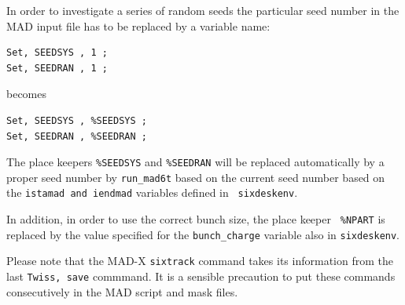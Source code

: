 \documentclass{cernatsnote}
\begin{document}
In order to investigate a series of random seeds the particular seed number in
the MAD input file has to be replaced by a variable name:
\begin{verbatim}
Set, SEEDSYS , 1 ;
Set, SEEDRAN , 1 ;
\end{verbatim}
becomes
\begin{verbatim}
Set, SEEDSYS , %SEEDSYS ;
Set, SEEDRAN , %SEEDRAN ;
\end{verbatim}
The place keepers {\tt \%SEEDSYS} and {\tt \%SEEDRAN} will be replaced
automatically by a proper seed number by {\tt run\_mad6t} based on the current
seed number based on the {\tt istamad and iendmad} variables defined in {\tt
sixdeskenv}.

In addition, in order to use the correct bunch size, the place keeper {\tt
\%NPART} is replaced by the value specified for the {\tt bunch\_charge}
variable also in {\tt sixdeskenv}.

Please note that the MAD-X {\tt sixtrack} command takes its information from
the last {\tt Twiss, save} commmand. It is a sensible precaution to put these
commands consecutively in the MAD script and mask files.
\end{document}
